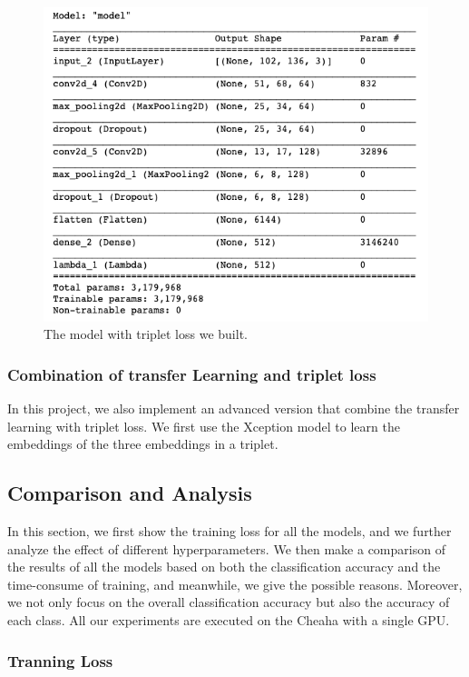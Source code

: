 \begin{figure}[h]
  \centering
  \includegraphics[width=\linewidth]{figs/tri_model.png}
  \caption{The model with triplet loss we built.}
  \label{fig:tri_model}
\end{figure}

\subsubsection{Combination of transfer Learning and triplet loss}
In this project, we also implement an advanced version that combine the transfer learning with triplet loss. We first use the Xception model to learn the embeddings of the three embeddings in a triplet. 



\subsection{Comparison and Analysis}

In this section, we first show the training loss for all the models, and we further analyze the effect of different hyperparameters. We then make a comparison of the results of all the models based on both the classification accuracy and the time-consume of training, and meanwhile, we give the possible reasons. Moreover, we not only focus on the overall classification accuracy but also the accuracy of each class. All our experiments are executed on the Cheaha with a single GPU. 

\subsubsection{Tranning Loss}

